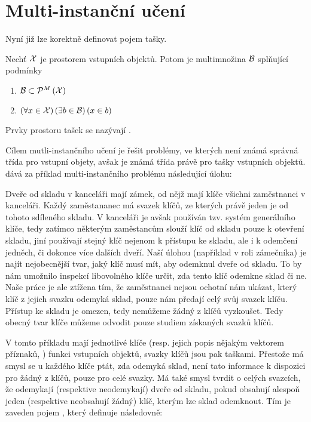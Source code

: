 \section{Multi-instanční učení}

Nyní již lze korektně definovat pojem tašky.

\begin{define}
	Nechť \( \mathcal X \) je prostorem vstupních objektů. Potom  je multimnožina \( \mathcal B \) splňující podmínky 
	\begin{enumerate}
		\item \( \mathcal B \subset \mathcal P^M \left( \mathcal X \right) \)
		\item \( \left( \forall x \in \mathcal X \right) \left( \exists b \in \mathcal B \right) \left( x \in b \right) \)
	\end{enumerate}
	Prvky prostoru tašek se nazývají .
\end{define}

Cílem mutli-instančního učení je řešit problémy, ve kterých není známá správná třída pro vstupní objety, avšak je známá třída právě pro tašky vstupních objektů. \cite{dietterich_solving_1997} dává za příklad multi-instančního problému následující úlohu:

\begin{example}
	Dveře od skladu v kanceláři mají zámek, od nějž mají klíče všichni zaměstnanci v kanceláři. Každý zaměstananec má svazek klíčů, ze kterých právě jeden je od tohoto sdíleného skladu. V kanceláři je avšak používán tzv. systém generálního klíče, tedy zatímco některým zaměstancům slouží klíč od skladu pouze k otevření skladu, jiní používají stejný klíč nejenom k přístupu ke skladu, ale i k odemčení jedněch, či dokonce více dalších dveří. Naší úlohou (například v roli zámečníka) je najít nejobecnější tvar, jaký klíč musí mít, aby odemknul dveře od skladu. To by nám umožnilo inspekcí libovolného klíče určit, zda tento klíč odemkne sklad či ne. Naše práce je ale ztížena tím, že zaměstnanci nejsou ochotní nám ukázat, který klíč z jejich svazku odemyká sklad, pouze nám předají celý svůj svazek klíču. Přístup ke skladu je omezen, tedy nemůžeme žádný z klíčů vyzkoušet. Tedy obecný tvar klíče můžeme odvodit pouze studiem získaných svazků klíčů.
\end{example}

V tomto příkladu mají jednotlivé klíče (resp. jejich popis nějakým vektorem příznaků, ) funkci vstupních objektů, svazky klíčů jsou pak taškami. Přestože má smysl se u každého klíče ptát, zda odemyká sklad, není tato informace k dispozici pro žádný z klíčů, pouze pro celé svazky. Má také smysl tvrdit o celých svazcích, že odemykají (respektive neodemykají) dveře od skladu, pokud obsahují alespoň jeden (respektive neobsahují žádný) klíč, kterým lze sklad odemknout. Tím je zaveden pojem , který \cite{dietterich_solving_1997} definuje následovně:


